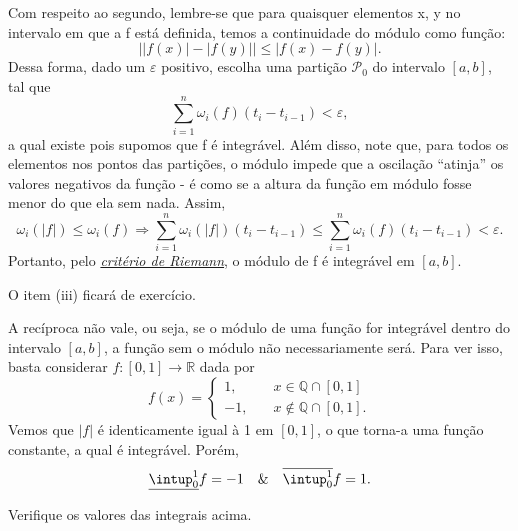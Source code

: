 \documentclass[../analysisII_notes.tex]{subfiles}
\begin{document}
\begin{proof*}
	Com respeito ao segundo, lembre-se que para quaisquer elementos x, y no intervalo em que a f está definida, temos a continuidade do módulo como função:
	\[
		\biggl\vert |f(x)|-|f(y)| \biggr\vert \leq |f(x) - f(y)|.
	\]
	Dessa forma, dado um \(\varepsilon \) positivo, escolha uma partição \(\mathcal{P}_{0}\) do intervalo \([a, b]\), tal que
	\[
		\sum\limits_{i=1}^{n}\omega_{i}(f)(t_{i}-t_{i-1})<\varepsilon,
	\]
	a qual existe pois supomos que f é integrável. Além disso, note que, para todos os elementos nos pontos das partições, o módulo impede que a oscilação ``atinja'' os valores negativos da função - é como se a altura da função em módulo fosse menor do que ela sem nada. Assim,
	\[
		\omega_{i}(|f|)\leq \omega_{i}(f) \Rightarrow \sum\limits_{i=1}^{n}\omega_{i}(|f|)(t_{i}-t_{i-1}) \leq \sum\limits_{i=1}^{n}\omega_{i}(f)(t_{i}-t_{i-1}) < \varepsilon.
	\]
	Portanto, pelo \hyperlink{integrability_conditions}{\textit{critério de Riemann}}, o módulo de f é integrável em \([a, b]\). \qedsymbol

	O item (iii) ficará de exercício.
\end{proof*}
\begin{example}
	A recíproca não vale, ou seja, se o módulo de uma função for integrável dentro do intervalo \([a, b]\), a função sem o módulo não necessariamente será. Para ver isso, basta considerar \(f:[0, 1]\rightarrow \mathbb{R}\) dada por
	\[
		f(x) = \left\{\begin{array}{ll}
			1,  & \quad x\in \mathbb{Q}\cap [0, 1]     \\
			-1, & \quad x\not\in \mathbb{Q}\cap [0,1].
		\end{array}\right.
	\]
	Vemos que \(|f|\) é identicamente igual à 1 em \([0, 1]\), o que torna-a uma função constante, a qual é integrável. Porém,
	\[
		\underline{\intup_{0}^{1}}f = -1 \quad\&\quad \overline{\intup_{0}^{1}}f = 1.
	\]
	\begin{exr}
		Verifique os valores das integrais acima.
	\end{exr}
\end{example}
\end{document}
